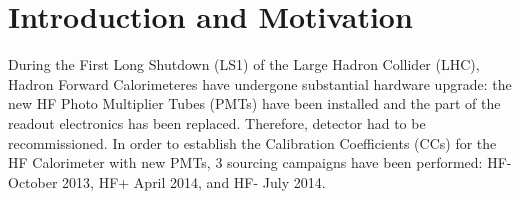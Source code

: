 \section{Introduction and Motivation}
During the First Long Shutdown (LS1) of the Large Hadron Collider (LHC), Hadron Forward Calorimeteres have undergone substantial hardware upgrade: the
new HF Photo Multiplier Tubes (PMTs) have been installed and the part of the readout electronics has been replaced. Therefore, detector had to be recommissioned. In order to establish the Calibration Coefficients (CCs) for the HF Calorimeter with new PMTs, 3
sourcing campaigns have been performed: HF- October 2013, HF+ April 2014, and
HF- July 2014.

